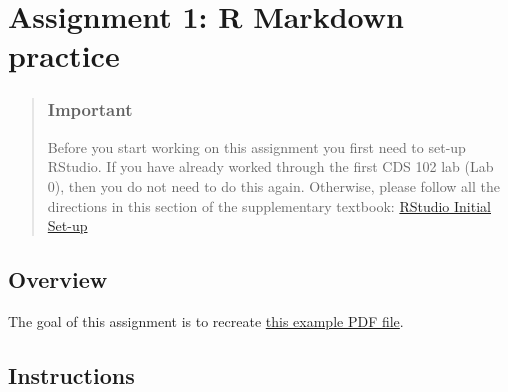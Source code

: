 \documentclass[
]{article}
\author{}
\date{\vspace{-2.5em}}
\begin{document}
\hypertarget{assignment-1-r-markdown-practice}{%
\section{Assignment 1: R Markdown
practice}\label{assignment-1-r-markdown-practice}}

\begin{quote}
\hypertarget{important}{%
\subsubsection{Important}\label{important}}

Before you start working on this assignment you first need to set-up
RStudio. If you have already worked through the first CDS 102 lab (Lab
0), then you do not need to do this again. Otherwise, please follow all
the directions in this section of the supplementary textbook:
\href{https://book.cds101.com/initial-set-up.html}{RStudio Initial
Set-up}
\end{quote}

\hypertarget{overview}{%
\subsection{Overview}\label{overview}}

The goal of this assignment is to recreate
\href{https://gmuedu-my.sharepoint.com/:b:/g/personal/dwhite34_gmu_edu/ESKWurLFXaFKnqnAo-krkXEBPP6h7gz9Fe-JIVPJCjzEhg?e=92BgLP}{this
example PDF file}.

\hypertarget{instructions}{%
\subsection{Instructions}\label{instructions}}
\end{document}
